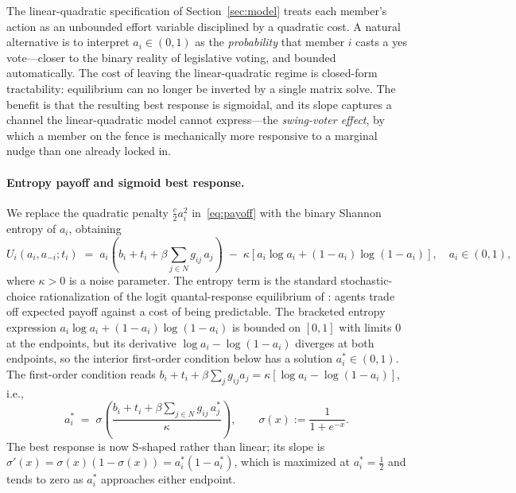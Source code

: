 \documentclass[11pt,letterpaper]{article}
\theoremstyle{plain}
\theoremstyle{definition}
\theoremstyle{remark}
\begin{document}
The linear-quadratic specification of Section~\ref{sec:model} treats each member's action as an unbounded effort variable disciplined by a quadratic cost. A natural alternative is to interpret $a_i \in (0,1)$ as the \emph{probability} that member $i$ casts a yes vote---closer to the binary reality of legislative voting, and bounded automatically. The cost of leaving the linear-quadratic regime is closed-form tractability: equilibrium can no longer be inverted by a single matrix solve. The benefit is that the resulting best response is sigmoidal, and its slope captures a channel the linear-quadratic model cannot express---the \emph{swing-voter effect}, by which a member on the fence is mechanically more responsive to a marginal nudge than one already locked in.

\paragraph{Entropy payoff and sigmoid best response.} We replace the quadratic penalty $\tfrac{c}{2}a_i^2$ in~\eqref{eq:payoff} with the binary Shannon entropy of $a_i$, obtaining
\begin{equation}
U_i(a_i, a_{-i}; t_i) \;=\; a_i\!\left(b_i + t_i + \beta \sum_{j \in N} g_{ij}\, a_j\right) \;-\; \kappa\!\left[a_i \log a_i + (1-a_i)\log(1-a_i)\right], \quad a_i \in (0,1),
\label{eq:payoff_B}
\end{equation}
where $\kappa > 0$ is a noise parameter. The entropy term is the standard stochastic-choice rationalization of the logit quantal-response equilibrium of \citet{mckelvey1995}: agents trade off expected payoff against a cost of being predictable. The bracketed entropy expression $a_i \log a_i + (1 - a_i)\log(1 - a_i)$ is bounded on $[0,1]$ with limits $0$ at the endpoints, but its derivative $\log a_i - \log(1-a_i)$ diverges at both endpoints, so the interior first-order condition below has a solution $a_i^* \in (0,1)$. The first-order condition reads $b_i + t_i + \beta \sum_j g_{ij} a_j = \kappa[\log a_i - \log(1-a_i)]$, i.e.,
\begin{equation}
a_i^* \;=\; \sigma\!\left(\frac{b_i + t_i + \beta \sum_{j \in N} g_{ij}\, a_j^*}{\kappa}\right), \qquad \sigma(x) := \frac{1}{1 + e^{-x}}.
\label{eq:sigmoid_BR}
\end{equation}
The best response is now S-shaped rather than linear; its slope is $\sigma'(x) = \sigma(x)(1-\sigma(x)) = a_i^*(1-a_i^*)$, which is maximized at $a_i^* = \tfrac{1}{2}$ and tends to zero as $a_i^*$ approaches either endpoint.
\end{document}
